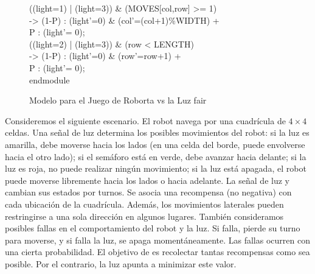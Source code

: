 \begin{figure}[h]
\begin{minipage}[h]{.47\textwidth}
{\begin{tabbing}
\>[r\_r] ((light=1) | (light=3)) \& (MOVES[col,row] >= 1)\\
\>                    \>\>-> \> (1-P) : (light'=0) \& (col'=(col+1)\%WIDTH) + \\
\>                     \>\>\> P : (light'= 0); \\[1ex]
\>[r\_f] ((light=2) | (light=3)) \& (row < LENGTH) \\
\>                    \>\>-> \> (1-P) : (light'=0) \& (row'=row+1)  + \\
\>                     \>\>\> P : (light'= 0);\\[1ex]
endmodule\\[-5ex]
\end{tabbing}}
\end{minipage}
\vspace{0.5cm}
\caption{Modelo para el Juego de Roborta vs la Luz fair} \label{fig:robot_game_model}
\end{figure}

Consideremos el siguiente escenario. El robot \roborta navega por una cuadrícula de $4 \times 4$ celdas. Una señal de luz
determina los posibles movimientos del robot: si la luz es amarilla, debe moverse hacia los lados (en una celda del borde, \roborta puede envolverse hacia el otro lado); si el semáforo está en verde, debe avanzar hacia delante; si la luz es roja, no puede realizar ningún movimiento; si la luz está apagada, el robot puede moverse libremente hacia los lados o hacia adelante. La señal de luz y \roborta cambian sus estados por turnos. Se asocia una recompensa (no negativa) con cada ubicación de la cuadrícula. Además, los movimientos laterales pueden restringirse a una sola dirección en algunos lugares.
También consideramos posibles fallas en el comportamiento del robot y la luz. Si \roborta falla, pierde su turno para moverse, y si falla la luz, se apaga momentáneamente. Las fallas ocurren con una cierta probabilidad. El objetivo de \roborta es recolectar tantas recompensas como sea posible. Por el contrario, la luz apunta a minimizar este valor.

